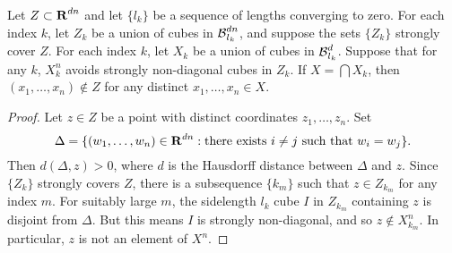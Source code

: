 \begin{lemma} \label{stronglydiagonal}
	Let $Z \subset \operatorname{\mathbf{R}}^{dn}$ and let $\{ l_k \}$ be a sequence of lengths converging to zero. For each index $k$, let $Z_k$ be a union of cubes in $\operatorname{\mathcal{B}}^{dn}_{l_k}$, and suppose the sets $\{ Z_k \}$ strongly cover $Z$. For each index $k$, let $X_k$ be a union of cubes in $\operatorname{\mathcal{B}}^d_{l_k}$. Suppose that for any $k$, $X_k^n$ avoids strongly non-diagonal cubes in $Z_k$. If $X = \bigcap X_k$, then $(x_1, \dots, x_n) \not \in Z$ for any distinct $x_1, \dots, x_n \in X$.
\end{lemma}
\begin{proof}
	Let $z \in Z$ be a point with distinct coordinates $z_1, \dots, z_n$. Set
	\[ \Delta = \{ (w_1, \dots, w_n) \in \operatorname{\mathbf{R}}^{dn}: \text{there exists $i \neq j$ such that $w_i = w_j$} \}. \]
	Then $d(\Delta,z) > 0$, where $d$ is the Hausdorff distance between $\Delta$ and $z$. Since $\{ Z_k \}$ strongly covers $Z$, there is a subsequence $\{ k_m \}$ such that $z \in Z_{k_m}$ for any index $m$. For suitably large $m$, the sidelength $l_k$ cube $I$ in $Z_{k_m}$ containing $z$ is disjoint from $\Delta$. But this means $I$ is strongly non-diagonal, and so $z \not \in X_{k_m}^n$. In particular, $z$ is not an element of $X^n$.
\end{proof}

